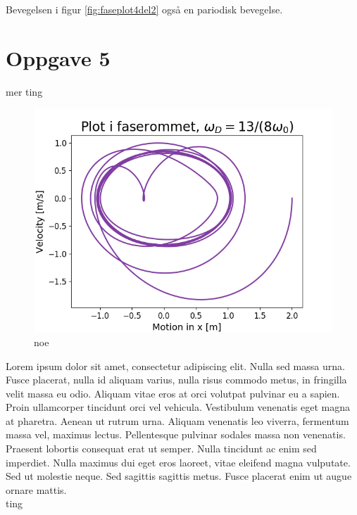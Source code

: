 \documentclass[norsk,a4paper,12pt]{article}
\begin{document}
Bevegelsen i figur \ref{fig:faseplot4del2} også en pariodisk bevegelse.



\section*{Oppgave 5}

mer ting
\begin{figure}[h]
\begin{center}
\includegraphics[scale=0.8]{Oppgave5del1.png}
\caption{noe}
\label{fig:faseplot5del1.png}
\end{center}
\end{figure}


Lorem ipsum dolor sit amet, consectetur adipiscing elit. Nulla sed massa urna. Fusce placerat, nulla id aliquam varius, nulla risus commodo metus, in fringilla velit massa eu odio. Aliquam vitae eros at orci volutpat pulvinar eu a sapien. Proin ullamcorper tincidunt orci vel vehicula. Vestibulum venenatis eget magna at pharetra. Aenean ut rutrum urna. Aliquam venenatis leo viverra, fermentum massa vel, maximus lectus. Pellentesque pulvinar sodales massa non venenatis. Praesent lobortis consequat erat ut semper. Nulla tincidunt ac enim sed imperdiet. Nulla maximus dui eget eros laoreet, vitae eleifend magna vulputate. Sed ut molestie neque. Sed sagittis sagittis metus. Fusce placerat enim ut augue ornare mattis.
\\
ting
\end{document}
